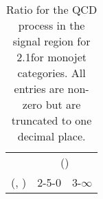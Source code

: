 \begin{table}[h!]
\tiny
\centering
\caption{Ratio for the QCD process in the signal region for 2.1\ifb for monojet categories. All entries are non-zero but are truncated to one decimal place.\label{tab:ratiosep_sig_qcd_mono}}
\begin{tabular}
{ccc}
	\hline\hline
	& \multicolumn{2}{c}{\scalht (\gev)} \\ 
	 (\njet,  \nb) & 2-5-0 & 3-$\infty$ \\ [0.8ex] 
\hline
	\hline
	\hline
\end{tabular}
\end{table}
